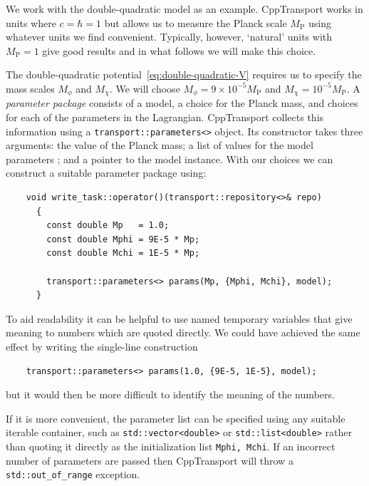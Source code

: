 \documentclass[11pt,a4paper]{article}
\newcommand{\Mp}{M_{\mathrm{P}}}
\newcommand{\packagefont}{\sffamily}
\newcommand{\CppTransport}{{\packagefont CppTransport}}
\newcommand{\semibold}[1]{{\fontseries{b}\selectfont{#1}}}
\newcommand{\para}[1]{\par\vspace{2mm}\noindent\semibold{{#1.}---}\ignorespaces}
\begin{document}
\para{Specifying parameters}
We work with the double-quadratic model as an example.
{\CppTransport} works in units where $c=\hbar=1$ but allows us
to measure the Planck scale $\Mp$ using whatever units we find
convenient.
Typically, however, `natural' units with $\Mp=1$ give good results
and in what follows we will make this choice.

The double-quadratic potential~\eqref{eq:double-quadratic-V}
requires us to specify the mass scales $M_\phi$ and $M_\chi$.
We will choose $M_\phi = 9 \times 10^{-5} \Mp$
and $M_\chi = 10^{-5} \Mp$.
A \emph{parameter package} consists of a model,
a choice for the Planck mass,
and choices for each of the parameters in the Lagrangian.
{\CppTransport} collects this information using a
\texttt{transport::parameters<>} object.
Its constructor takes three arguments:
the value of the Planck mass;
a list of values for the model parameters
\semibold{in the same order they were declared in the model
description file};
and a pointer to the model instance.
With our choices we can construct a suitable parameter package using:
\begin{verbatim}
	void write_task::operator()(transport::repository<>& repo)
	  {
	    const double Mp   = 1.0;
	    const double Mphi = 9E-5 * Mp;
	    const double Mchi = 1E-5 * Mp;
	
	    transport::parameters<> params(Mp, {Mphi, Mchi}, model);	
	  }
\end{verbatim}
To aid readability it can be helpful to use named temporary variables
that give meaning to numbers which are quoted directly.
We could have achieved the same effect by writing
the single-line construction
\begin{verbatim}
	transport::parameters<> params(1.0, {9E-5, 1E-5}, model);	
\end{verbatim}
but it would then be more difficult to identify the meaning of the
numbers.

If it is more convenient,
the parameter list can be specified using any suitable iterable
container, such as
\texttt{std::vector<double>}
or
\texttt{std::list<double>}
rather than quoting it directly as the initialization list
\texttt{{Mphi, Mchi}}.
If an incorrect number of parameters are passed
then {\CppTransport} will throw
a \texttt{std::out_of_range} exception.
\end{document}
